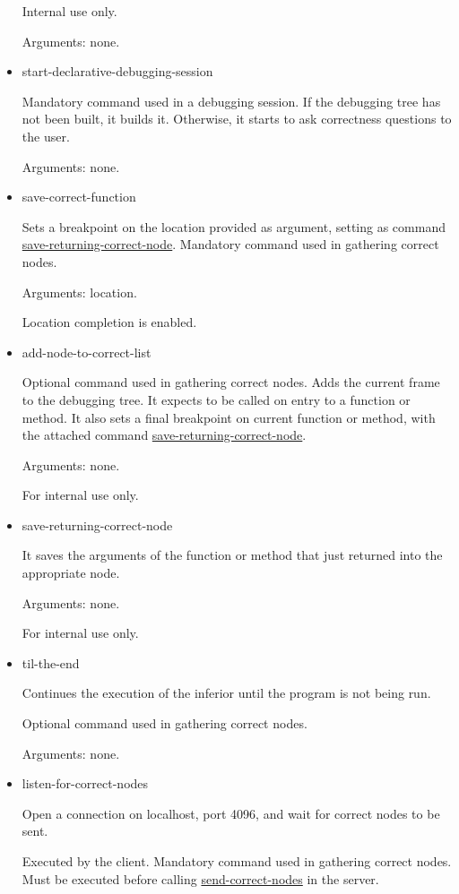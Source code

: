 \begin{itemize}
Internal use only.

Arguments: none.
\item start-declarative-debugging-session
\label{command:start-declarative-debugging-session}

Mandatory command used in a debugging session.
If the debugging tree has not been built, it builds it. Otherwise, it starts to ask correctness questions to the user.

Arguments: none.
\item save-correct-function
\label{command:save-correct-function}

Sets a breakpoint on the location provided as argument, setting as command \hyperref[command:save-returning-correct-node]{save-returning-correct-node}. Mandatory command used in gathering correct nodes.

Arguments: location.

Location completion is enabled.
\item add-node-to-correct-list
\label{command:add-node-to-correct-list}

Optional command used in gathering correct nodes.
Adds the current frame to the debugging tree.
It expects to be called on entry to a function or method.
It also sets a final breakpoint on current function or method, with the attached command \hyperref[command:save-returning-correct-node]{save-returning-correct-node}.

Arguments: none.

For internal use only.
\item save-returning-correct-node
\label{command:save-returning-correct-node}

It saves the arguments of the function or method that just returned into the appropriate node.

Arguments: none.

For internal use only.
\item til-the-end
\label{command:til-the-end}

Continues the execution of the inferior until the program is not being run.

Optional command used in gathering correct nodes.

Arguments: none.
\item listen-for-correct-nodes
\label{command:listen-for-correct-nodes}

Open a connection on localhost, port 4096, and wait for correct nodes to be sent.

Executed by the client.
Mandatory command used in gathering correct nodes.
Must be executed before calling \hyperref[command:send-correct-nodes]{send-correct-nodes} in the server.


\end{itemize}
